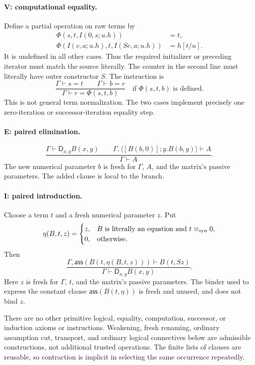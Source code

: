 \documentclass[11pt,letterpaper]{article}
\theoremstyle{definition}\newtheorem{definition}[theorem]{Definition}
\newcommand{\D}{\mathsf D}
\newcommand{\cl}[2]{\langle #1;#2\rangle}
\newcommand{\ass}[1]{\mathsf{ass}(#1)}
\newcommand{\eqsyn}{\mathrel{\equiv_{\rm syn}}}
\begin{document}
\paragraph{V: computational equality.}
Define a partial operation on raw terms by
\begin{align*}
 \Phi(s,t,I(0,s;u.h))&=t,\\
 \Phi(I(c,a;u.h),t,I(Sc,a;u.h))&=h[t/u].
\end{align*}
It is undefined in all other cases. Thus the required initializer or
preceding iterator must match the source literally. The counter in the
second line must literally have outer constructor $S$.
The instruction is
\[
 \frac{\Gamma\vdash s=t\qquad\Gamma\vdash b=r}
      {\Gamma\vdash r=\Phi(s,t,b)}
 \quad\text{if $\Phi(s,t,b)$ is defined}.                \tag{V}
\]
This is not general term normalization. The two cases implement precisely
one zero-iteration or successor-iteration equality step.

\paragraph{E: paired elimination.}
\[
 \frac{\Gamma\vdash\D_{x,y}B(x,y)\qquad
       \Gamma,\cl{[B(b,0)]}{y.B(b,y)}\vdash A}
      {\Gamma\vdash A}.                                \tag{E}
\]
The new numerical parameter $b$ is fresh for $\Gamma$, $A$, and the
matrix's passive parameters. The added clause is local to the branch.

\paragraph{I: paired introduction.}
Choose a term $t$ and a fresh numerical parameter $z$. Put
\[
 \eta(B,t,z)=
 \begin{cases}
 z,& B\text{ is literally an equation and }t\eqsyn0,\\
 0,&\text{otherwise.}
 \end{cases}
\]
Then
\[
 \frac{\Gamma,\ass{B(t,\eta(B,t,z))}\vdash B(t,Sz)}
      {\Gamma\vdash\D_{x,y}B(x,y)}.                     \tag{I}
\]
Here $z$ is fresh for $\Gamma$, $t$, and the matrix's passive parameters.
The binder used to express the constant clause $\ass{B(t,\eta)}$ is
fresh and unused, and does not bind $z$.

There are no other primitive logical, equality, computation, successor,
or induction axioms or instructions. Weakening, fresh renaming, ordinary
assumption cut, transport, and ordinary logical connectives below are
admissible constructions, not additional trusted operations. The finite
lists of clauses are reusable, so contraction is implicit in selecting
the same occurrence repeatedly.
\end{document}
